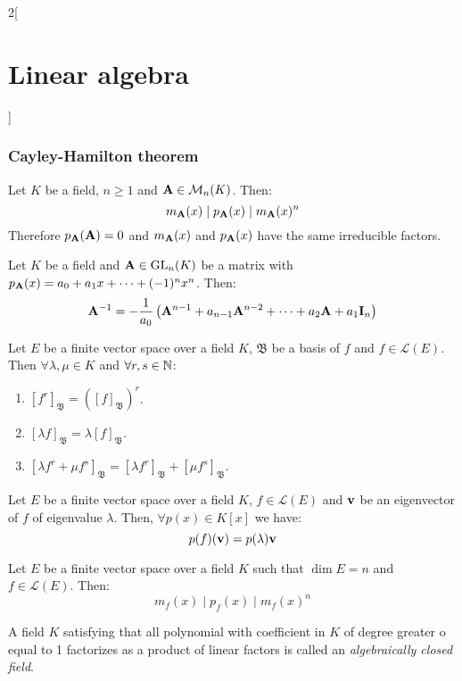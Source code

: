 \documentclass[../../../main.tex]{subfiles}
\begin{document}
\begin{multicols}{2}[\section{Linear algebra}]
\subsubsection*{Cayley-Hamilton theorem}
\begin{theorem}
    Let $K$ be a field, $n\geq 1$ and $\vb{A}\in\mathcal{M}_n(K)$. Then: $$m_{\vb{A}}(x)\mid p_{\vb{A}}(x)\mid m_{\vb{A}}(x)^n$$ Therefore $p_{\vb{A}}(\vb{A})=0$ and $m_{\vb{A}}(x)$ and $p_{\vb{A}}(x)$ have the same irreducible factors.
\end{theorem}
\begin{corollary}
    Let $K$ be a field and $\vb{A}\in\mathrm{GL}_n(K)$ be a matrix with $p_{\vb{A}}(x)=a_0+a_1x+\cdots+(-1)^nx^n$. Then: $$\vb{A}^{-1}=-\frac{1}{a_0}\left(\vb{A}^{n-1}+a_{n-1}\vb{A}^{n-2}+\cdots+a_2\vb{A}+a_1\vb{I}_n\right)$$
\end{corollary}
\begin{lemma}
    Let $E$ be a finite vector space over a field $K$, $\mathfrak{B}$ be a basis of $f$ and $f\in\mathcal{L}(E)$. Then $\forall\lambda,\mu\in K$ and $\forall r,s\in\mathbb{N}$: 
    \begin{enumerate}
        \item $[f^r]_\mathfrak{B}={\left([f]_\mathfrak{B}\right)}^r$.
        \item $[\lambda f]_\mathfrak{B}=\lambda[f]_\mathfrak{B}$.
        \item $[\lambda f^r+\mu f^s]_\mathfrak{B}=[\lambda f^r]_\mathfrak{B}+[\mu f^s]_\mathfrak{B}$.
    \end{enumerate}
\end{lemma}
\begin{lemma}
    Let $E$ be a finite vector space over a field $K$, $f\in\mathcal{L}(E)$ and $\vb{v}$ be an eigenvector of $f$ of eigenvalue $\lambda$. Then, $\forall p(x)\in K[x]$ we have: $$p(f)(\vb{v})=p(\lambda)\vb{v}$$
\end{lemma}
\begin{theorem}
    Let $E$ be a finite vector space over a field $K$ such that $\dim E=n$ and $f\in\mathcal{L}(E)$. Then: $$m_f(x)\mid p_f(x)\mid m_f(x)^n$$ 
\end{theorem}
\begin{definition}
    A field $K$ satisfying that all polynomial with coefficient in $K$ of degree greater o equal to 1 factorizes as a product of linear factors is called an \textit{algebraically closed field}.

\end{definition}
\end{multicols}
\end{document}
